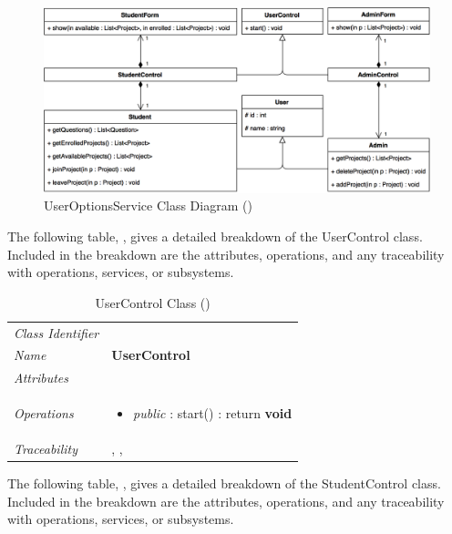 \documentclass[12pt,letterpaper]{article}
\begin{document}
\begin{figure}[H]
	\centering{}
	\includegraphics[scale=0.33]{imgs/d3/interfaces/user-options.png}
	\caption{UserOptionsService Class Diagram ()}
\end{figure}

The following table, , gives a detailed breakdown of the UserControl class. Included in the breakdown are the attributes, operations, and any traceability with operations, services, or subsystems.

\begin{table}[H]
    \caption{UserControl Class ()} 
	\begin{tabu} to 
		\toprule
		Class Identifier &  \\
		Name & {\bf UserControl} \\
		Attributes &\\

		Operations &
		\begin{minipage}[t]{\linewidth}
			\begin{itemize}
			    \item {\it public} : start() : return {\bf void}
	        \end{itemize}
	    \end{minipage} \\
	    	Traceability & , , \\
		\toprule
	\end{tabu}
\end{table}

The following table, , gives a detailed breakdown of the StudentControl class. Included in the breakdown are the attributes, operations, and any traceability with operations, services, or subsystems.
\end{document}
